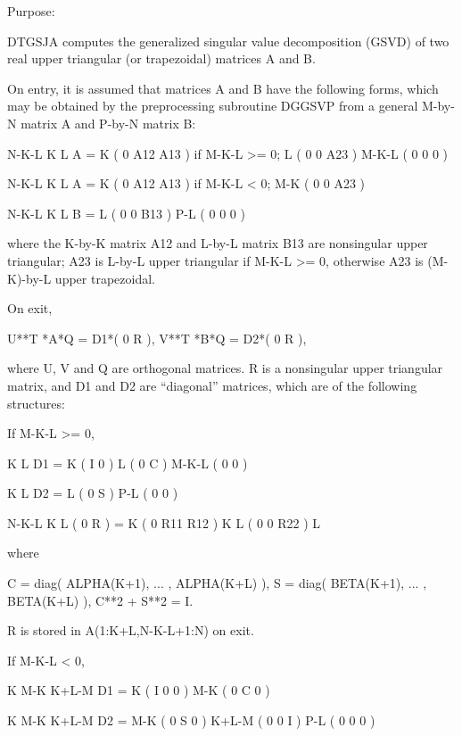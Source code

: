  \begin{DoxyParagraph}{Purpose\+: }
\begin{DoxyVerb} DTGSJA computes the generalized singular value decomposition (GSVD)
 of two real upper triangular (or trapezoidal) matrices A and B.

 On entry, it is assumed that matrices A and B have the following
 forms, which may be obtained by the preprocessing subroutine DGGSVP
 from a general M-by-N matrix A and P-by-N matrix B:

              N-K-L  K    L
    A =    K ( 0    A12  A13 ) if M-K-L >= 0;
           L ( 0     0   A23 )
       M-K-L ( 0     0    0  )

            N-K-L  K    L
    A =  K ( 0    A12  A13 ) if M-K-L < 0;
       M-K ( 0     0   A23 )

            N-K-L  K    L
    B =  L ( 0     0   B13 )
       P-L ( 0     0    0  )

 where the K-by-K matrix A12 and L-by-L matrix B13 are nonsingular
 upper triangular; A23 is L-by-L upper triangular if M-K-L >= 0,
 otherwise A23 is (M-K)-by-L upper trapezoidal.

 On exit,

        U**T *A*Q = D1*( 0 R ),    V**T *B*Q = D2*( 0 R ),

 where U, V and Q are orthogonal matrices.
 R is a nonsingular upper triangular matrix, and D1 and D2 are
 ``diagonal'' matrices, which are of the following structures:

 If M-K-L >= 0,

                     K  L
        D1 =     K ( I  0 )
                 L ( 0  C )
             M-K-L ( 0  0 )

                   K  L
        D2 = L   ( 0  S )
             P-L ( 0  0 )

                N-K-L  K    L
   ( 0 R ) = K (  0   R11  R12 ) K
             L (  0    0   R22 ) L

 where

   C = diag( ALPHA(K+1), ... , ALPHA(K+L) ),
   S = diag( BETA(K+1),  ... , BETA(K+L) ),
   C**2 + S**2 = I.

   R is stored in A(1:K+L,N-K-L+1:N) on exit.

 If M-K-L < 0,

                K M-K K+L-M
     D1 =   K ( I  0    0   )
          M-K ( 0  C    0   )

                  K M-K K+L-M
     D2 =   M-K ( 0  S    0   )
          K+L-M ( 0  0    I   )
            P-L ( 0  0    0   )


\end{DoxyVerb}
\end{DoxyParagraph}
